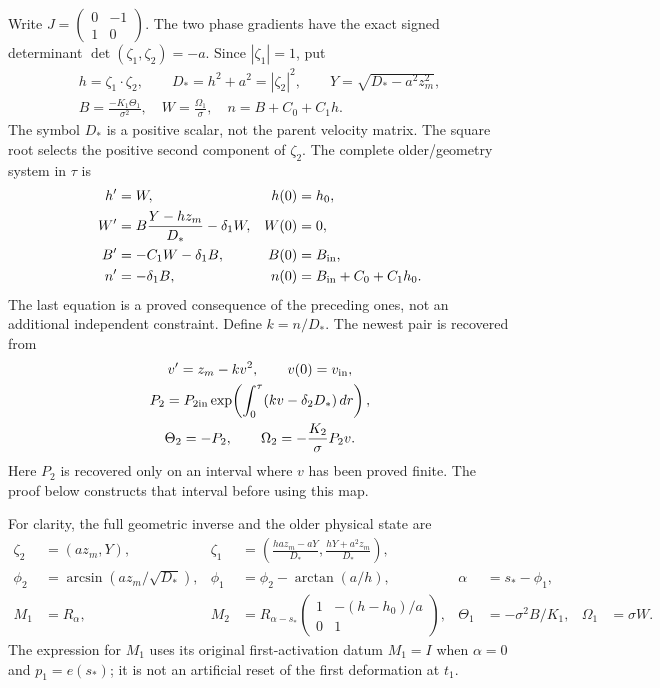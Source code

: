Write $J=\left(\begin{smallmatrix}0&-1\\1&0\end{smallmatrix}\right)$.
The two phase gradients have the exact signed determinant
$\det(\zeta_1,\zeta_2)=-a$. Since $|\zeta_1|=1$, put
\[
 \begin{gathered}
 h=\zeta_1\cdot\zeta_2,\qquad
 D_*=h^2+a^2=|\zeta_2|^2,\qquad
 Y=\sqrt{D_*-a^2z_m^2},\\
 B=\frac{-K_1\Theta_1}{\sigma^2},\quad
 W=\frac{\Omega_1}{\sigma},\quad
 n=B+C_0+C_1h.
 \end{gathered}
\]
The symbol $D_*$ is a positive scalar, not the parent velocity matrix.
The square root selects the positive second component of $\zeta_2$.
The complete older/geometry system in $\tau$ is
\begin{equation}\label{cvlane:sr:closed}
 \begin{aligned}
 h'&=W,&h(0)&=h_0,\\
 W'&=B\frac{Y-hz_m}{D_*}-\delta_1W,&W(0)&=0,\\
 B'&=-C_1W-\delta_1B,&B(0)&=B_{\rm in},\\
 n'&=-\delta_1B,&n(0)&=B_{\rm in}+C_0+C_1h_0.
 \end{aligned}
\end{equation}
The last equation is a proved consequence of the preceding ones, not
an additional independent constraint. Define $k=n/D_*$. The newest
pair is recovered from
\begin{equation}\label{cvlane:sr:newest}
 \begin{gathered}
 v'=z_m-kv^2,\qquad v(0)=v_{\rm in},\\
 P_2=P_{2\rm in}\exp\!\left(\int_0^\tau(kv-\delta_2D_*)\,dr\right),\\
 \Theta_2=-P_2,\qquad
 \Omega_2=-\frac{K_2}{\sigma}P_2v.
 \end{gathered}
\end{equation}
Here $P_2$ is recovered only on an interval where $v$ has been proved
finite. The proof below constructs that interval before using this map.

For clarity, the full geometric inverse and the older physical state are
\begin{align}\label{cvlane:sr:inverse}
 \zeta_2&=(az_m,Y),&
 \zeta_1&=\left(\frac{haz_m-aY}{D_*},
                    \frac{hY+a^2z_m}{D_*}\right),\\
 \phi_2&=\arcsin(az_m/\sqrt{D_*}),&
 \phi_1&=\phi_2-\arctan(a/h),&\alpha&=s_*-\phi_1,\nonumber\\
 M_1&=R_\alpha,&
 M_2&=R_{\alpha-s_*}
       \begin{pmatrix}1&-(h-h_0)/a\\0&1\end{pmatrix},&
 \Theta_1&=-\sigma^2B/K_1,&\Omega_1&=\sigma W.\nonumber
\end{align}
The expression for $M_1$ uses its original first-activation datum
$M_1=I$ when $\alpha=0$ and $p_1=e(s_*)$; it is not an artificial
reset of the first deformation at $t_1$.


